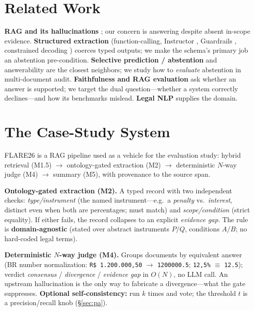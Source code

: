 \documentclass[11pt]{article}
\begin{document}
\section{Related Work}
\textbf{RAG and its hallucinations} \cite{lewis2020rag,gao2023ragsurvey}; our
concern is answering despite absent in-scope evidence. \textbf{Structured
extraction} (function-calling, Instructor \cite{instructor}, Guardrails
\cite{guardrails}, constrained decoding \cite{willard2023guided}) coerces typed
outputs; we make the schema's primary job an abstention pre-condition.
\textbf{Selective prediction / abstention}
\cite{geifman2017selective,kadavath2022know} and answerability
\cite{rajpurkar2018squad2} are the closest neighbors; we study how to
\emph{evaluate} abstention in multi-document audit. \textbf{Faithfulness and RAG
evaluation} \cite{ji2023survey,maynez2020faithfulness,es2024ragas} ask whether an
answer is supported; we target the dual question---whether a system correctly
declines---and how its benchmarks mislead. \textbf{Legal NLP}
\cite{hendrycks2021cuad,chalkidis2020legalbert} supplies the domain.

\section{The Case-Study System}
\label{sec:system}
FLARE26 is a RAG pipeline used as a vehicle for the evaluation study: hybrid
retrieval (M1.5) $\to$ ontology-gated extraction (M2) $\to$ deterministic
$N$-way judge (M4) $\to$ summary (M5), with provenance to the source span.

\textbf{Ontology-gated extraction (M2).} A typed record with two independent
checks: \emph{type/instrument} (the named instrument---e.g.\ a \emph{penalty}
vs.\ \emph{interest}, distinct even when both are percentages; must match) and
\emph{scope/condition} (strict equality). If either fails, the record collapses
to an explicit \emph{evidence gap}. The rule is \textbf{domain-agnostic} (stated
over abstract instruments $P/Q$, conditions $A/B$; no hard-coded legal terms).

\textbf{Deterministic $N$-way judge (M4).} Groups documents by equivalent answer
(BR number normalization: \texttt{R\$ 1.200.000,50} $\to$ \texttt{1200000.5};
\texttt{12,5\%} $\equiv$ \texttt{12.5}); verdict \emph{consensus} /
\emph{divergence} / \emph{evidence gap} in $O(N)$, no LLM call. An upstream
hallucination is the only way to fabricate a divergence---what the gate
suppresses. \textbf{Optional self-consistency:} run $k$ times and vote; the
threshold $t$ is a precision/recall knob (\S\ref{sec:pa}).
\end{document}
